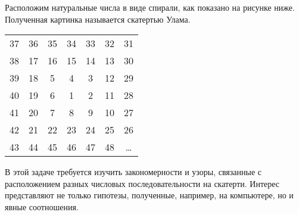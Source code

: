 
Расположим натуральные числа в виде спирали, как показано на рисунке ниже. Полученная картинка называется скатертью Улама.

\begin{center}
\begin{tabular}{ c c c c c c c }
37 & 36 & 35 & 34 & 33 & 32 & 31 \\
38 & 17 & 16 & 15 & 14 & 13 & 30 \\
39 & 18 & 5  & 4  & 3  & 12 & 29 \\
40 & 19 & 6  & 1  & 2  & 11 & 28 \\
41 & 20 & 7  & 8  & 9  & 10 & 27 \\
42 & 21 & 22 & 23 & 24 & 25 & 26 \\
43 & 44 & 45 & 46 & 47 & 48 & \ldots
\end{tabular}
\end{center}

В этой задаче требуется изучить закономерности и узоры, связанные с расположением разных числовых последовательности на скатерти. Интерес представляют не только гипотезы, полученные, например, на компьютере, но и явные соотношения.

